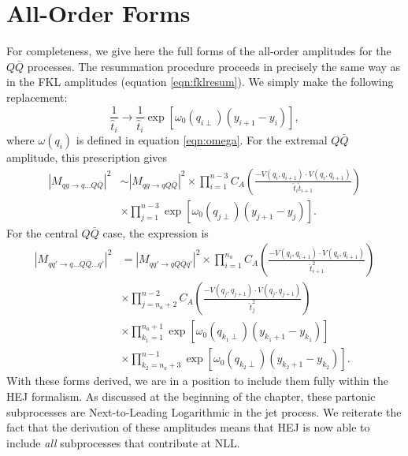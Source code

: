 \section{All-Order Forms}
For completeness, we give here the full forms of the all-order amplitudes for the $Q\bar{Q}$ processes. The resummation procedure proceeds in precisely the same way as in the FKL amplitudes (equation \ref{eqn:fklresum}). We simply make the following replacement:
\begin{equation}
\frac{1}{\hat{t}_i} \to \frac{1}{\hat{t}_i} \exp \left[ \omega_0(q_{i\perp})(y_{i+1} - y_i) \right],
\end{equation}
where $\omega(q_i)$ is defined in equation \ref{eqn:omega}. For the extremal $Q\bar{Q}$ amplitude, this prescription gives
\begin{equation}
\begin{split}
|M_{qg \to q...Q\bar{Q}}|^2 &\sim |M_{qg \to qQ\bar{Q}}|^2 \times \prod_{i=1}^{n-3}  C_A \left(\frac{-V(q_i,q_{i+1}) \cdot V(q_i,q_{i+1})}{\hat{t}_i \hat{t}_{i+1}} \right) \\
& \times \prod_{j =1}^{n-3} \exp \left[ \omega_0(q_{j \perp})(y_{j+1} - y_j) \right].
\end{split}
\end{equation}
For the central $Q\bar{Q}$ case, the expression is
\begin{equation}
\begin{split}
|M_{qq' \to q...Q\bar{Q}...q'}|^2 &= |M_{qq' \to qQ\bar{Q}q'}|^2 \times \prod_{i=1}^{n_a} C_A \left(\frac{-V(q_i,q_{i+1}) \cdot V(q_i,q_{i+1})}{\hat{t}_{i+1}^2} \right) \\
&\times \prod_{j=n_a+2}^{n-2} C_A \left(\frac{-V(q_j,q_{j+1}) \cdot V(q_j,q_{j+1})}{\hat{t}_j^2} \right) \\
& \times \prod_{k_1=1}^{n_a+1} \exp \left[ \omega_0(q_{k_1 \perp})(y_{k_1+1} - y_{k_1}) \right]  \\
& \times \prod_{k_2=n_a+3}^{n-1} \exp \left[ \omega_0(q_{k_2 \perp})(y_{k_2+1} - y_{k_2}) \right].
\end{split}
\end{equation}
With these forms derived, we are in a position to include them fully within the HEJ formalism. As discussed at the beginning of the chapter, these partonic subprocesses are Next-to-Leading Logarithmic in the jet process. We reiterate the fact that the derivation of these amplitudes means that HEJ is now able to include \emph{all} subprocesses that contribute at NLL. 
